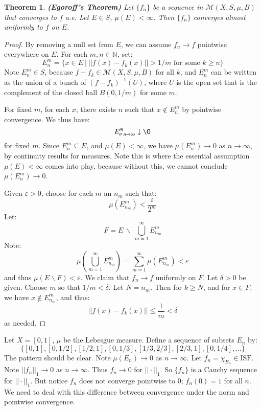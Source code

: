 \documentclass[a4paper,12pt]{report}
\newcommand{\ms}[1]{\mathscr{#1}}
\newcommand{\varep}{ \varepsilon }
\newcommand{\sse} {\subseteq}
\newtheorem{theorem}{Theorem}[section]
\newenvironment{remark}[1][Remark.]{\begin{trivlist}
\item[\hskip \labelsep {\bfseries #1}]}{\end{trivlist}}
\begin{document}
	\begin{theorem}
	\emph{\textbf{(Egoroff's Theorem)}}
	Let $\{f_n\}$ be a sequence in $\ms{M}(X, S, \mu, B)$ that converges to $f$ a.e. Let $E \in S$, $\mu(E) < \infty$. Then $\{f_n\}$ converges almost uniformly to $f$ on $E$. 
	\end{theorem}
	\begin{proof}
	By removing a null set from $E$, we can assume $f_n \rightarrow f$ pointwise everywhere on $E$. For each $m, n \in \mathbb{N}$, set:
	\[ E_n^m = \{x \in E ~|~ ||f(x) - f_k(x)|| > 1 / m \text{ for some } k \geq n \} \]
	Note $E_n^m \in S$, because $f - f_k \in  \ms{M}(X, S, \mu, B)$ for all $k$, and $E_n^m$ can be written as the union of a bunch of $(f - f_k)^{-1}(U)$, where $U$ is the open set that is the complement of the closed ball $B(0, 1/m)$ for some $m$. 
	
	For fixed $m$, for each $x$, there exists $n$ such that $x \notin E_n^m$ by pointwise convergence. We thus have:
	\[ {E_n^m}_{n \rightarrow \infty}\downarrow \O \]
	for fixed $m$. Since $E_n^m \sse E$, and $\mu(E) < \infty$, we have $\mu(E_n^m) \rightarrow 0$ as $n \rightarrow \infty$, by continuity results for measures. Note this is where the essential assumption $\mu(E) < \infty$ comes into play, because without this, we cannot conclude $\mu(E_n^m) \rightarrow 0$. 
	
	Given $\varep > 0$, choose for each $m$ an $n_m$ such that:
	\[ \mu(E_{n_m}^m) < \frac{\varep}{2^m} \]
	Let:
	\[ F = E ~ \backslash ~ \bigcup_{m=1}^\infty E_{n_m}^m \]
	Note:
	\[ \mu\left(\bigcup_{m=1}^\infty E_{n_m}^m \right) = \sum_{m=1}^\infty \mu(E_{n_m}^m) < \varep \]
	and thus $\mu(E \backslash F) < \varep$. We claim that $f_n \rightarrow f$ uniformly on $F$. Let $\delta > 0$ be given. Choose $m$ so that $1/m < \delta$. Let $N = n_m$. Then for $k \geq N$, and for $x \in F$, we have $x \notin E_{n_m}^m$, and thus:
	\[ ||f(x) - f_k(x)|| \leq \frac{1}{m} < \delta \]
	as needed. 
	\end{proof}

	\begin{remark}
	Let $X = [0, 1]$, $\mu$ be the Lebesgue measure. Define a sequence of subsets $E_n$ by: 
	\[ \{[0, 1], [0, 1/2], [1/2, 1], [0, 1/3], [1/3, 2/3], [2/3, 1], [0, 1/4], \ldots \} \]
	The pattern should be clear. Note $\mu(E_n) \rightarrow 0$ as $n \rightarrow \infty$. Let $f_n = \chi_{E_n} \in \text{ISF}$. Note $||f_n||_1 \rightarrow 0$ as $n \rightarrow \infty$. Thus $f_n \rightarrow 0$ for $||\cdot||_1$. So $\{f_n\}$ is a Cauchy sequence for $||\cdot||_1$. But notice $f_n$ does not converge pointwise to 0; $f_n(0) = 1$ for all $n$. We need to deal with this difference between convergence under the norm and pointwise convergence. 
	\end{remark}	
	
\end{document}
